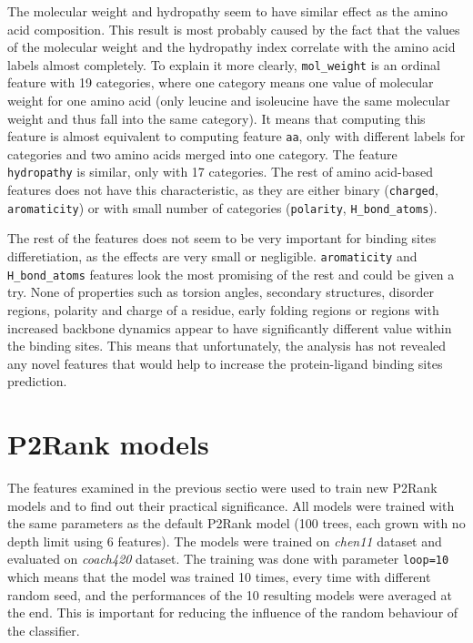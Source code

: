 The molecular weight and hydropathy seem to have similar effect as the amino acid composition. This result is most probably caused by the fact that the values of the molecular weight and the hydropathy index correlate with the amino acid labels almost completely. To explain it more clearly, \texttt{mol\_weight} is an ordinal feature with 19 categories, where one category means one value of molecular weight for one amino acid (only leucine and isoleucine have the same molecular weight and thus fall into the same category). It means that computing this feature is almost equivalent to computing feature \texttt{aa}, only with different labels for categories and two amino acids merged into one category. The feature \texttt{hydropathy} is similar, only with 17 categories. The rest of amino acid-based features does not have this characteristic, as they are either binary (\texttt{charged}, \texttt{aromaticity}) or with small number of categories (\texttt{polarity}, \texttt{H\_bond\_atoms}).

The rest of the features does not seem to be very important for binding sites differetiation, as the effects are very small or negligible. \texttt{aromaticity} and \texttt{H\_bond\_atoms} features look the most promising of the rest and could be given a try. None of properties such as torsion angles, secondary structures, disorder regions, polarity and charge of a residue, early folding regions or regions with increased backbone dynamics appear to have significantly different value within the binding sites. This means that unfortunately, the analysis has not revealed any novel features that would help to increase the protein-ligand binding sites prediction.

\newpage

\section{P2Rank models}

The features examined in the previous sectio were used to train new P2Rank models and to find out their practical significance. All models were trained with the same parameters as the default P2Rank model (100 trees, each grown with no depth limit using 6 features). The models were trained on \textit{chen11} dataset and evaluated on \textit{coach420} dataset. The training was done with parameter \texttt{loop=10} which means that the model was trained 10 times, every time with different random seed, and the performances of the 10 resulting models were averaged at the end. This is important for reducing the influence of the random behaviour of the classifier.

